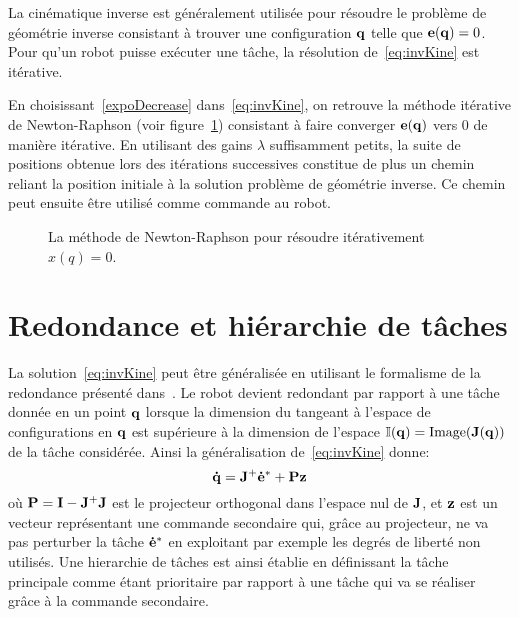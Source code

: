 La cinématique inverse est généralement utilisée pour résoudre le problème de
géométrie inverse consistant à trouver une configuration ${\mathbf{q}}$ telle que
${\mathbf{e}}({\mathbf{q}}) = 0$. 
Pour qu'un robot puisse exécuter une t\^ache, la résolution
de~\eqref{eq:invKine} est itérative.

En choisissant~\eqref{expoDecrease} dans~\eqref{eq:invKine}, on retrouve
la méthode itérative de Newton-Raphson (voir figure~\ref{fig:NewtonRaphson})
consistant à faire converger ${\mathbf{e}}({\mathbf{q}})$ vers $0$ de manière itérative.
En utilisant des gains $\lambda$ suffisamment petits, la suite de 
positions obtenue lors des itérations successives 
constitue de plus un chemin reliant la position initiale à la solution
problème de géométrie inverse. Ce chemin peut ensuite
être utilisé comme commande au robot.
\begin{figure}[t]
  \begin{center}
    \resizebox{0.6\textwidth}{!}{
    
    }
  \end{center}
  \caption{La méthode de Newton-Raphson pour résoudre itérativement $x(q) =0$.}
  \label{fig:NewtonRaphson}
\end{figure}

\section{Redondance et hiérarchie de t\^aches}
\label{chap:Redondance}
La solution~\eqref{eq:invKine} peut être généralisée en utilisant le
formalisme de la redondance présenté dans~\cite{siciliano91}. Le robot devient redondant par rapport à une t\^ache
donnée en un point ${\mathbf{q}}$ lorsque la dimension du tangeant à l'espace de configurations
en ${\mathbf{q}}$ est supérieure
à la dimension de l'espace $\mathbb{I}({\mathbf{q}}) = \mathrm{Image}({\mathbf{J}}({\mathbf{q}}))$ de la t\^ache considérée. Ainsi la généralisation
de~\eqref{eq:invKine} donne:
\begin{equation}
  \mbf{\dot{q}} = \mbf{J}^+ \mbf{\dot{e}^*} + \mbf{P}\mbf{z} 
  \label{eq:controlLaw}
\end{equation}
où ${\mathbf{P}} = {\mathbf{I}} - {\mathbf{J}}^+{\mathbf{J}}$ est le projecteur orthogonal
dans l'espace nul de ${\mathbf{J}}$, et ${\mathbf{z}}$ est un vecteur représentant
une commande secondaire qui, gr\^ace au projecteur,
ne va pas perturber la t\^ache ${\mathbf{\dot{e}^*}}$ en exploitant par exemple
les degrés de liberté non utilisés. Une hierarchie de t\^aches est ainsi
établie en définissant la t\^ache principale comme étant prioritaire par
rapport à une t\^ache qui va se réaliser gr\^ace à la commande secondaire.

